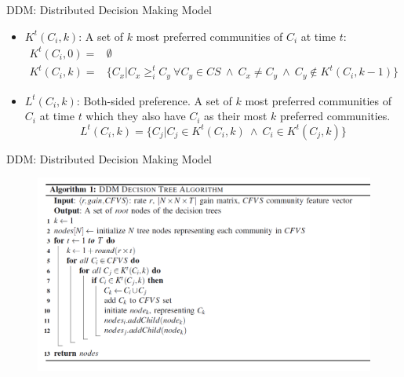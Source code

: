 \documentclass{beamer}
\begin{document}
\begin{frame}{DDM: Distributed Decision Making Model}
    \footnotesize
    \begin{itemize}       
        \item {\color{blue}$K^t(C_i, k)$:} A set of $k$ most preferred communities of $C_i$ at time $t$:
            \footnotesize
            \begin{equation*}\label{h_t_pref_top}
                \begin{split}				
                    K^t(C_i, 0) = &\emptyset \\
                    K^t(C_i, k) = &\Big\{C_x | C_x \geq_{i}^t C_y ~\forall C_y \in CS ~\wedge~ C_x \neq C_y ~\wedge~ C_y \notin K^t(C_i, k-1) \Big\}				
                \end{split}
            \end{equation*}            
        \item {\color{blue}$L^t(C_i,k)$:} Both-sided preference. A set of $k$ most preferred communities of $C_i$ at time $t$ which they also have $C_i$ as their most $k$ preferred communities.
            \footnotesize
            \begin{equation*}\label{l_t_top_both}                
                L^t(C_i,k) = \Big\{C_j | C_j \in K^t(C_i, k)~ \wedge~ C_i \in K^t(C_j, k)\Big\}                 
            \end{equation*}
    \end{itemize}
\end{frame}
\begin{frame}{DDM: Distributed Decision Making Model}
    \begin{figure}[htbp]
        \centering
        \includegraphics[scale=0.3]{figures/alg.png}
    \end{figure}
\end{frame}
\end{document}
